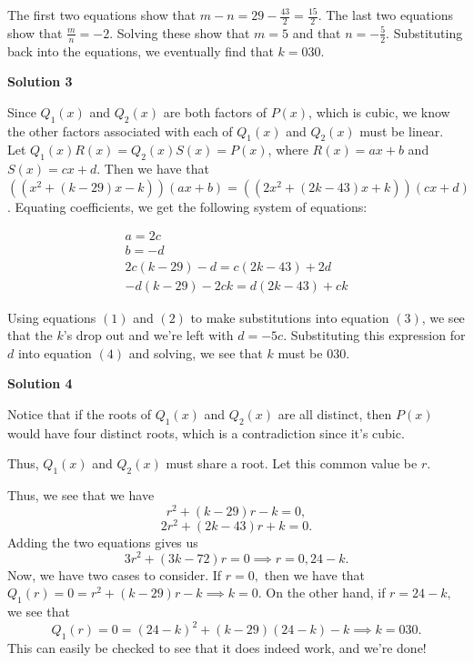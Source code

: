 \begin{enumerate}
 The first two equations show that $m - n = 29 - \frac{43}{2} = \frac{15}{2}$. The last two equations show that $\frac{m}{n} = -2$. Solving these show that $m = 5$ and that $n = -\frac{5}{2}$. Substituting back into the equations, we eventually find that $k = \boxed{030}$.

 



\textbf{Solution 3}

Since $Q_1(x)$ and $Q_2(x)$ are both factors of $P(x)$, which is cubic, we know the other factors associated with each of $Q_1(x)$ and $Q_2(x)$ must be linear. Let $Q_1(x)R(x) = Q_2(x)S(x) = P(x)$, where $R(x) = ax + b$ and $S(x) = cx + d$. Then we have that $((x^2 + (k-29)x - k))(ax + b) = ((2x^2+ (2k-43)x + k))(cx + d)$. Equating coefficients, we get the following system of equations: 

 
 \begin{align}  a = 2c \\ b = -d \\ 2c(k - 29) - d = c(2k - 43) + 2d \\ -d(k - 29) - 2ck = d(2k - 43) + ck  \end{align}

 Using equations $(1)$ and $(2)$ to make substitutions into equation $(3)$, we see that the $k$'s drop out and we're left with $d = -5c$. Substituting this expression for $d$ into equation $(4)$ and solving, we see that $k$ must be $\boxed {030}$.  

 



\textbf{Solution 4}

Notice that if the roots of $Q_1(x)$ and $Q_2(x)$ are all distinct, then $P(x)$ would have four distinct roots, which is a contradiction since it's cubic. 

 Thus, $Q_1(x)$ and $Q_2(x)$ must share a root. Let this common value be $r.$ 

 Thus, we see that we have 
 \[r^2 + (k - 29)r - k = 0,\]
 \[2r^2 + (2k - 43)r + k = 0.\] Adding the two equations gives us 
 \[3r^2 + (3k - 72)r = 0 \implies r = 0, 24 - k.\] Now, we have two cases to consider. If $r = 0,$ then we have that $Q_1(r) = 0 = r^2 + (k - 29)r - k \implies k = 0.$ On the other hand, if $r = 24 - k,$ we see that 
 \[Q_1(r) = 0 = (24 - k)^2 + (k - 29)(24 - k) - k \implies k = \boxed{030}.\] This can easily be checked to see that it does indeed work, and we're done! 

 




\end{enumerate}
